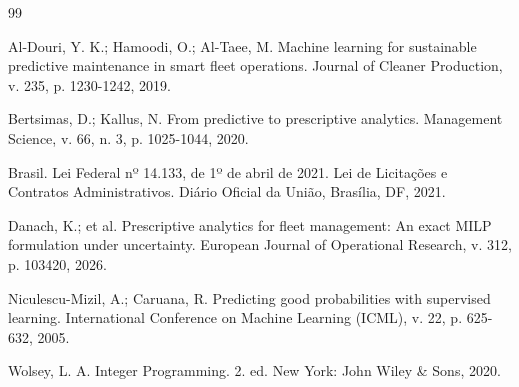 \documentclass[12pt,a4paper]{article}
\begin{document}
\begin{thebibliography}{99}

 Al-Douri, Y. K.; Hamoodi, O.; Al-Taee, M. Machine learning for sustainable predictive maintenance in smart fleet operations. Journal of Cleaner Production, v. 235, p. 1230-1242, 2019.

 Bertsimas, D.; Kallus, N. From predictive to prescriptive analytics. Management Science, v. 66, n. 3, p. 1025-1044, 2020.

 Brasil. Lei Federal nº 14.133, de 1º de abril de 2021. Lei de Licitações e Contratos Administrativos. Diário Oficial da União, Brasília, DF, 2021.

 Danach, K.; et al. Prescriptive analytics for fleet management: An exact MILP formulation under uncertainty. European Journal of Operational Research, v. 312, p. 103420, 2026.

 Niculescu-Mizil, A.; Caruana, R. Predicting good probabilities with supervised learning. International Conference on Machine Learning (ICML), v. 22, p. 625-632, 2005.

 Wolsey, L. A. Integer Programming. 2. ed. New York: John Wiley \& Sons, 2020.

\end{thebibliography}
\end{document}
